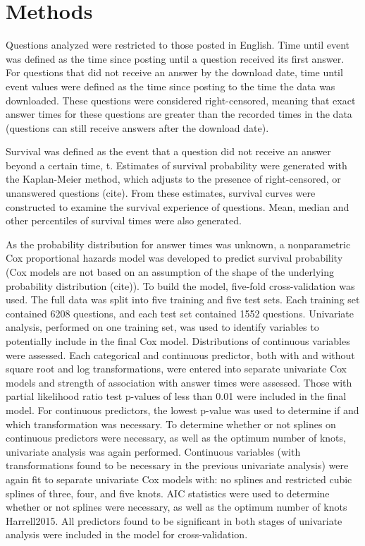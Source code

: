 \documentclass{article}
\begin{document}
\section*{Methods}



Questions analyzed were restricted to those posted in English. Time until event was defined as the time since posting until a question received its first answer. For questions that did not receive an answer by the download date, time until event values were defined as the time since posting to the time the data was downloaded. These questions were considered right-censored, meaning that exact answer times for these questions are greater than the recorded times in the data (questions can still receive answers after the download date). 

Survival was defined as the event that a question did not receive an answer beyond a certain time, t. Estimates of survival probability were generated with the Kaplan-Meier method, which adjusts to the presence of right-censored, or unanswered questions (cite). From these estimates, survival curves were constructed to examine the survival experience of questions. Mean, median and other percentiles of survival times were also generated. 

As the probability distribution for answer times was unknown, a nonparametric Cox proportional hazards model was developed to predict survival probability (Cox models are not based on an assumption of the shape of the underlying probability distribution (cite)). To build the model, five-fold cross-validation was used. The full data was split into five training and five test sets. Each training set contained 6208 questions, and each test set contained 1552 questions. Univariate analysis, performed on one training set, was used to identify variables to potentially include in the final Cox model. Distributions of continuous variables were assessed. Each categorical and continuous predictor, both with and without square root and log transformations, were entered into separate univariate Cox models and strength of association with answer times were assessed. Those with partial likelihood ratio test p-values of less than 0.01 were included in the final model. For continuous predictors, the lowest p-value was used to determine if and which transformation was necessary. To determine whether or not splines on continuous predictors were necessary, as well as the optimum number of knots, univariate analysis was again performed. Continuous variables (with transformations found to be necessary in the previous univariate analysis) were again fit to separate univariate Cox models with: no splines and restricted cubic splines of three, four, and five knots. AIC statistics were used to determine whether or not splines were necessary, as well as the optimum number of knots \citep{}Harrell2015. All predictors found to be significant in both stages of univariate analysis were included in the model for cross-validation. 
\end{document}
